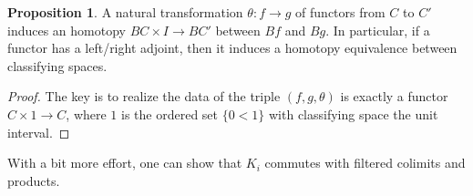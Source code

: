 \documentclass{article}
\theoremstyle{definition}
\theoremstyle{definition}
\theoremstyle{definition}
\theoremstyle{definition}
\newtheorem{proposition}{Proposition}[theorem]
\theoremstyle{definition}
\theoremstyle{definition}
\theoremstyle{definition}
\begin{document}
\begin{tcolorbox}[colback=blue!5!white,colframe=blue!30!white]
\begin{proposition}
A natural transformation $\theta: f\to g$ of functors from $C$ to $C'$ induces an homotopy $BC\times I\to BC'$ between $Bf$ and $Bg$. In particular, if a functor has a left/right adjoint, then it induces a homotopy equivalence between classifying spaces. 
\end{proposition}
\end{tcolorbox}
\begin{proof}
    The key is to realize the data of the triple $(f,g,\theta)$ is exactly a functor $C\times 1\to C$, where $1$ is the ordered set $\{0<1\}$ with classifying space the unit interval.
\end{proof}

With a bit more effort, one can show that $K_i$ commutes with filtered colimits and products. 





\printbibliography
\end{document}
